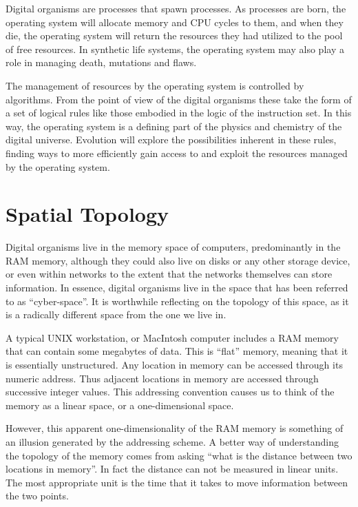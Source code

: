 Digital organisms are processes that spawn processes.  As processes
are born, the operating system will allocate memory and CPU cycles
to them, and when they die, the operating system will return the
resources they had utilized to the pool of free resources.  In
synthetic life systems, the operating system may also play a role
in managing death, mutations and flaws.

The management of resources by the operating system is controlled
by algorithms.  From the point of view of the digital organisms these
take the form of a set of logical rules like those embodied in the
logic of the instruction set.  In this way, the operating system
is a defining part of the physics and chemistry of the digital
universe.  Evolution will explore the possibilities inherent in
these rules, finding ways to more efficiently gain access to and
exploit the resources managed by the operating system.

\section{Spatial Topology}

Digital organisms live in the memory space of computers, predominantly
in the RAM memory, although they could also live on disks or any other
storage device, or even within networks to the extent that the networks
themselves can store information.  In essence, digital organisms
live in the space that has been referred to as ``cyber-space''.
It is worthwhile reflecting on the topology of this space, as it is
a radically different space from the one we live in.

A typical UNIX workstation, or MacIntosh computer includes a RAM memory
that can contain some megabytes of data.  This is ``flat'' memory,
meaning that it is essentially unstructured.  Any location in memory
can be accessed through its numeric address.  Thus adjacent locations
in memory are accessed through successive integer values.  This addressing
convention causes us to think of the memory as a linear space, or a
one-dimensional space.

However, this apparent one-dimensionality of the RAM memory is something
of an illusion generated by the addressing scheme.  A better way of
understanding the topology of the memory comes from asking ``what is the
distance between two locations in memory''.  In fact the distance can not
be measured in linear units.  The most appropriate unit is the time that
it takes to move information between the two points.

